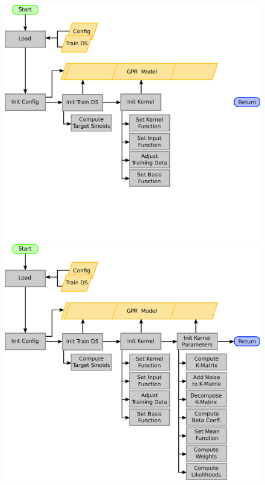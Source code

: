 \documentclass{beamer}
\begin{document}
\begin{frame}
\begin{columns}[c]
\begin{figure}
\begin{overprint}
			\includegraphics[width=\linewidth]{images/GPR_Initialization-4}
			\onslide<5>\includegraphics[width=\linewidth]{images/GPR_Initialization}
		\end{overprint}
	\end{figure}
\end{columns}
\end{frame}
\end{document}

